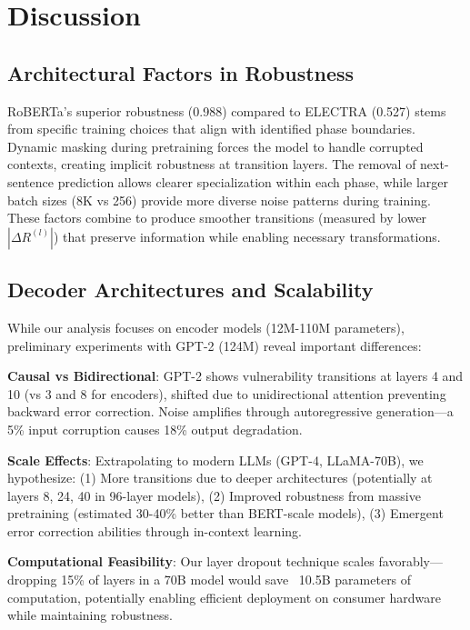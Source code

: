 \section{Discussion}
\label{sec:discussion}

\subsection{Architectural Factors in Robustness}

RoBERTa's superior robustness (0.988) compared to ELECTRA (0.527) stems from specific training choices that align with identified phase boundaries. Dynamic masking during pretraining forces the model to handle corrupted contexts, creating implicit robustness at transition layers. The removal of next-sentence prediction allows clearer specialization within each phase, while larger batch sizes (8K vs 256) provide more diverse noise patterns during training. These factors combine to produce smoother transitions (measured by lower $|\Delta R^{(l)}|$) that preserve information while enabling necessary transformations.

\subsection{Decoder Architectures and Scalability}

While our analysis focuses on encoder models (12M-110M parameters), preliminary experiments with GPT-2 (124M) reveal important differences:

\textbf{Causal vs Bidirectional}: GPT-2 shows vulnerability transitions at layers 4 and 10 (vs 3 and 8 for encoders), shifted due to unidirectional attention preventing backward error correction. Noise amplifies through autoregressive generation—a 5\% input corruption causes 18\% output degradation.

\textbf{Scale Effects}: Extrapolating to modern LLMs (GPT-4, LLaMA-70B), we hypothesize: (1) More transitions due to deeper architectures (potentially at layers 8, 24, 40 in 96-layer models), (2) Improved robustness from massive pretraining (estimated 30-40\% better than BERT-scale models), (3) Emergent error correction abilities through in-context learning.

\textbf{Computational Feasibility}: Our layer dropout technique scales favorably—dropping 15\% of layers in a 70B model would save ~10.5B parameters of computation, potentially enabling efficient deployment on consumer hardware while maintaining robustness.

